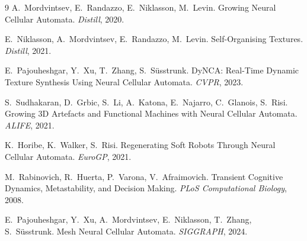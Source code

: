 \documentclass[11pt]{article}
\begin{document}
\begin{thebibliography}{9}
A.~Mordvintsev, E.~Randazzo, E.~Niklasson, M.~Levin.
\newblock Growing Neural Cellular Automata.
\newblock \emph{Distill}, 2020.

E.~Niklasson, A.~Mordvintsev, E.~Randazzo, M.~Levin.
\newblock Self-Organising Textures.
\newblock \emph{Distill}, 2021.

E.~Pajouheshgar, Y.~Xu, T.~Zhang, S.~S\"usstrunk.
\newblock DyNCA: Real-Time Dynamic Texture Synthesis Using Neural Cellular
Automata.
\newblock \emph{CVPR}, 2023.

S.~Sudhakaran, D.~Grbic, S.~Li, A.~Katona, E.~Najarro, C.~Glanois, S.~Risi.
\newblock Growing 3D Artefacts and Functional Machines with Neural Cellular
Automata.
\newblock \emph{ALIFE}, 2021.

K.~Horibe, K.~Walker, S.~Risi.
\newblock Regenerating Soft Robots Through Neural Cellular Automata.
\newblock \emph{EuroGP}, 2021.

M.~Rabinovich, R.~Huerta, P.~Varona, V.~Afraimovich.
\newblock Transient Cognitive Dynamics, Metastability, and Decision Making.
\newblock \emph{PLoS Computational Biology}, 2008.

E.~Pajouheshgar, Y.~Xu, A.~Mordvintsev, E.~Niklasson, T.~Zhang, S.~S\"usstrunk.
\newblock Mesh Neural Cellular Automata.
\newblock \emph{SIGGRAPH}, 2024.
\end{thebibliography}
\end{document}
